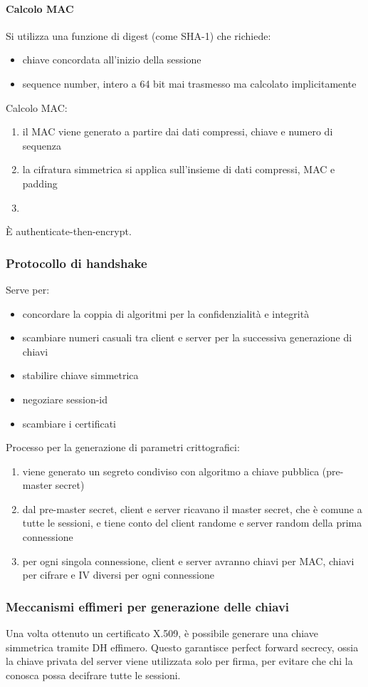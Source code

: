 \documentclass[11pt]{article}
\begin{document}
\paragraph*{Calcolo MAC}
Si utilizza una funzione di digest (come SHA-1) che richiede:
\begin{itemize}
    \item chiave concordata all'inizio della sessione 
    \item sequence number, intero a 64 bit mai trasmesso ma calcolato implicitamente 
\end{itemize}
Calcolo MAC:
\begin{enumerate}
    \item il MAC viene generato a partire dai dati compressi, chiave e numero di sequenza
    \item la cifratura simmetrica si applica sull'insieme di dati compressi, MAC e padding 
    \item 
\end{enumerate}
È authenticate-then-encrypt.
\subsubsection{Protocollo di handshake}
Serve per:
\begin{itemize}
    \item concordare la coppia di algoritmi per la confidenzialità e integrità 
    \item scambiare numeri casuali tra client e server per la successiva generazione di chiavi 
    \item stabilire chiave simmetrica 
    \item negoziare session-id 
    \item scambiare i certificati  
\end{itemize}
Processo per la generazione di parametri crittografici:
\begin{enumerate}
    \item viene generato un segreto condiviso con algoritmo a chiave pubblica (pre-master secret)
    \item dal pre-master secret, client e server ricavano il master secret, che è comune a tutte le sessioni, e tiene conto del client randome e server random della prima connessione 
    \item per ogni singola connessione, client e server avranno chiavi per MAC, chiavi per cifrare e IV diversi per ogni 
    connessione  
\end{enumerate}
\subsubsection{Meccanismi effimeri per generazione delle chiavi}
Una volta ottenuto un certificato X.509, è possibile generare una chiave simmetrica tramite DH effimero. Questo garantisce 
perfect forward secrecy, ossia la chiave privata del server viene utilizzata solo per firma, per evitare che chi la conosca 
possa decifrare tutte le sessioni. 
\end{document}
